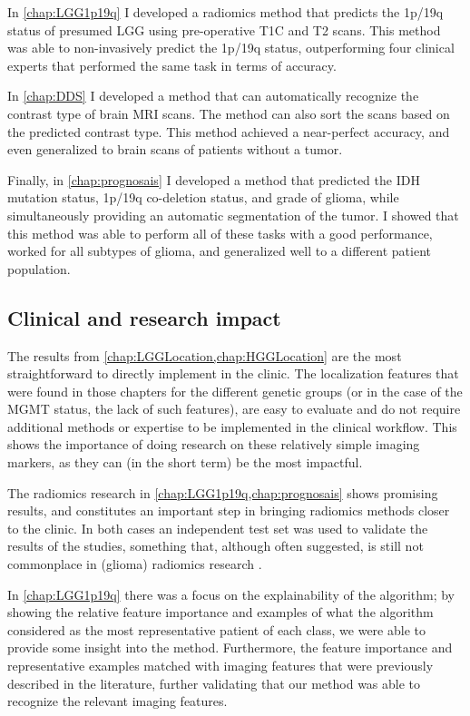 In \cref{chap:LGG1p19q} I developed a radiomics method that predicts the 1p/19q status of presumed \gls{LGG} using pre-operative \acrlong{T1C} and \acrlong{T2} scans.
This method was able to non-invasively predict the 1p/19q status, outperforming four clinical experts that performed the same task in terms of accuracy.

In \cref{chap:DDS} I developed a method that can automatically recognize the contrast type of brain \gls{MRI} scans.
The method can also sort the scans based on the predicted contrast type.
This method achieved a near-perfect accuracy, and even generalized to brain scans of patients without a \gls{tumor}.

Finally, in \cref{chap:prognosais} I developed a method that predicted the \gls{IDH} mutation status, 1p/19q co-deletion status, and grade of glioma, while simultaneously providing an automatic segmentation of the \gls{tumor}.
I showed that this method was able to perform all of these tasks with a good performance, worked for all subtypes of glioma, and generalized well to a different patient population.


\subsection{Clinical and research impact}

The results from \cref{chap:LGGLocation,chap:HGGLocation} are the most straightforward to directly implement in the clinic.
The localization features that were found in those chapters for the different genetic groups (or in the case of the \gls{MGMT} status, the lack of such features), are easy to evaluate and do not require additional methods or expertise to be implemented in the clinical workflow.
This shows the importance of doing research on these relatively simple imaging markers, as they can (in the short term) be the most impactful.

The radiomics research in \cref{chap:LGG1p19q,chap:prognosais} shows promising results, and constitutes an important step in bringing radiomics methods closer to the clinic.
In both cases an independent test set was used to validate the results of the studies, something that, although often suggested, is still not commonplace in (glioma) radiomics research \autocite{gillies2016radiomics, rizzo2018radiomics, lohmann2020radiomics, yip2016applicationsradiomics}.

In \cref{chap:LGG1p19q} there was a focus on the explainability of the algorithm; by showing the relative feature importance and examples of what the algorithm considered as the most representative patient of each class, we were able to provide some insight into the method.
Furthermore, the feature importance and representative examples matched with imaging features that were previously described in the literature, further validating that our method was able to recognize the relevant imaging features.

